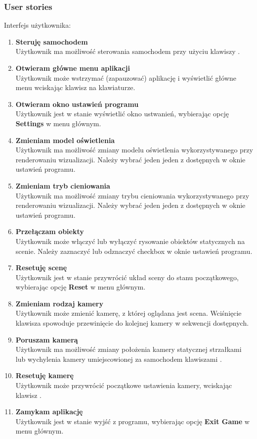 \documentclass[10pt,a4paper]{article}
\begin{document}
\subsubsection{User stories}
Interfejs użytkownika:
\begin{enumerate}[label*=\arabic*.]
	\itemsep0em 
	\item \textbf{Steruję samochodem} \\
	Użytkownik ma możliwość sterowania samochodem przy użyciu klawiszy .
	\item \textbf{Otwieram główne menu aplikacji} \\
	Użytkownik może wstrzymać (zapauzować) aplikację i wyświetlić główne menu wciskając klawisz  na klawiaturze.
	\item \textbf{Otwieram okno ustawień programu} \\
	Użytkownik jest w stanie wyświetlić okno ustwanień, wybierając opcję \textbf{Settings} w menu głównym.
	\item \textbf{Zmieniam model oświetlenia} \\
	Użytkownik ma możliwość zmiany modelu oświetlenia wykorzystywanego przy renderowaniu wizualizacji. Należy wybrać jeden jeden z dostępnych w oknie ustawień programu.
	\item \textbf{Zmieniam tryb cieniowania} \\
	Użytkownik ma możliwość zmiany trybu cieniowania wykorzystywanego przy renderowaniu wizualizacji. Należy wybrać jeden jeden z dostępnych w oknie ustawień programu.
	\item \textbf{Przełączam obiekty} \\
	Użytkownik może włączyć lub wyłączyć rysowanie obiektów statycznych na scenie. Należy zaznaczyć lub odznaczyć checkbox w oknie ustawień programu.
	\item \textbf{Resetuję scenę} \\
	Użytkownik jest w stanie przywrócić układ sceny do stanu początkowego, wybierając opcję \textbf{Reset} w menu głównym.
	\item \textbf{Zmieniam rodzaj kamery} \\
	Użytkownik może zmienić kamerę, z której oglądana jest scena. Wciśnięcie klawisza  spowoduje przewinięcie do kolejnej kamery w sekwencji dostępnych.
	\item \textbf{Poruszam kamerą} \\
	Użytkownik ma możliwość zmiany położenia kamery statycznej strzałkami lub wychylenia kamery umiejscowionej za samochodem klawiszami .
	\item \textbf{Resetuję kamerę} \\
	Użytkownik może przywrócić początkowe ustawienia kamery, wciskając klawisz .
	\item \textbf{Zamykam aplikację} \\
	Użytkownik jest w stanie wyjść z programu, wybierając opcję \textbf{Exit Game} w menu głównym.
\end{enumerate}
\end{document}
